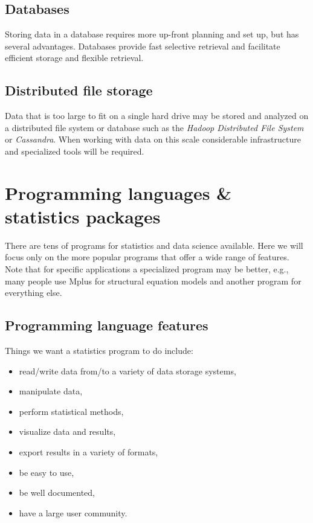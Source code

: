 \documentclass[]{book}
\providecommand{\tightlist}{%
  \setlength{\itemsep}{0pt}\setlength{\parskip}{0pt}}
\begin{document}
\hypertarget{databases}{%
\subsection{Databases}\label{databases}}

Storing data in a database requires more up-front planning and set up, but has several advantages. Databases provide fast selective retrieval and facilitate efficient storage and flexible retrieval.

\hypertarget{distributed-file-storage}{%
\subsection{Distributed file storage}\label{distributed-file-storage}}

Data that is too large to fit on a single hard drive may be stored and analyzed on a distributed file system or database such as the \emph{Hadoop Distributed File System} or \emph{Cassandra}. When working with data on this scale considerable infrastructure and specialized tools will be required.

\hypertarget{programming-languages-statistics-packages}{%
\section{Programming languages \& statistics packages}\label{programming-languages-statistics-packages}}

There are tens of programs for statistics and data science available. Here we will focus only on the more popular programs that offer a wide range of features. Note that for specific applications a specialized program may be better, e.g., many people use Mplus for structural equation models and another program for everything else.

\hypertarget{programming-language-features}{%
\subsection{Programming language features}\label{programming-language-features}}

Things we want a statistics program to do include:

\begin{itemize}
\tightlist
\item
  read/write data from/to a variety of data storage systems,
\item
  manipulate data,
\item
  perform statistical methods,
\item
  visualize data and results,
\item
  export results in a variety of formats,
\item
  be easy to use,
\item
  be well documented,
\item
  have a large user community.
\end{itemize}
\end{document}
